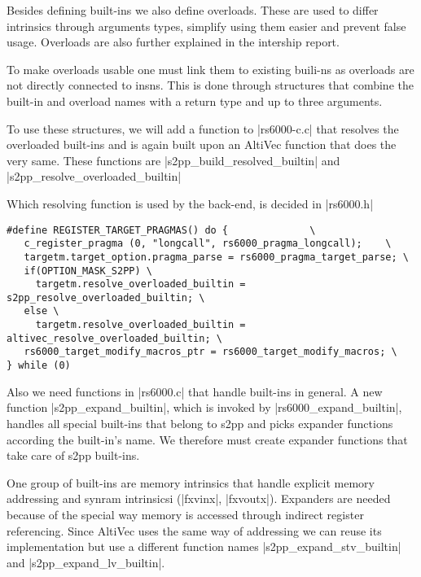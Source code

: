 Besides defining built-ins we also define overloads.
These are used to differ intrinsics through arguments types, simplify using them easier and prevent false usage.
Overloads are also further explained in the intership report\citep{heimbrecht_2017internship}.

To make overloads usable one must link them to existing buili-ns as overloads are not directly connected to insns.
This is done through structures that combine the built-in and overload names with a return type and up to three arguments.

To use these structures, we will add a function to |rs6000-c.c| that resolves the overloaded built-ins and is again built upon an AltiVec function that does the very same.
These functions are |s2pp_build_resolved_builtin| and |s2pp_resolve_overloaded_builtin|

Which resolving function is used by the back-end, is decided in |rs6000.h|
\begin{lstlisting}
#define REGISTER_TARGET_PRAGMAS() do {              \
   c_register_pragma (0, "longcall", rs6000_pragma_longcall);    \
   targetm.target_option.pragma_parse = rs6000_pragma_target_parse; \
   if(OPTION_MASK_S2PP) \
     targetm.resolve_overloaded_builtin = s2pp_resolve_overloaded_builtin; \
   else \
     targetm.resolve_overloaded_builtin = altivec_resolve_overloaded_builtin; \
   rs6000_target_modify_macros_ptr = rs6000_target_modify_macros; \
} while (0)
\end{lstlisting}

Also we need functions in |rs6000.c| that handle built-ins in general.
A new function |s2pp_expand_builtin|, which is invoked by |rs6000_expand_builtin|, handles all special built-ins that belong to s2pp and picks expander functions according the built-in's name.
We therefore must create expander functions that take care of s2pp built-ins.

One group of built-ins are memory intrinsics that handle explicit memory addressing and synram intrinsicsi (|fxvinx|, |fxvoutx|).
Expanders are needed because of the special way memory is accessed through indirect register referencing.
Since AltiVec uses the same way of addressing we can reuse its implementation but use a different function names |s2pp_expand_stv_builtin| and |s2pp_expand_lv_builtin|.

